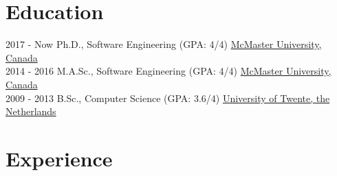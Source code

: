 \documentclass[letterpaper]{twentysecondcv} %
\begin{document}
\makeprofile %



\section{Education}

\begin{twenty} %
  \twentyitem
    {2017 - Now}
    {}
    {Ph.D., Software Engineering \textnormal{(GPA: 4/4)}}
    {\href{https://www.mcmaster.ca/}{McMaster University, Canada}}
    {}
    {}
    \\
  \twentyitem
    {2014 - 2016}
    {}
    {M.A.Sc., Software Engineering \textnormal{(GPA: 4/4)}}
    {\href{https://www.mcmaster.ca/}{McMaster University, Canada}}
    {}
    {}
    \\
  \twentyitem
    {2009 - 2013}
    {}
    {B.Sc., Computer Science \textnormal{(GPA: 3.6/4)}}
    {\href{https://www.utwente.nl/}{University of Twente, the Netherlands}}
    {}
    {}
\end{twenty}
\vspace{-.5em}


\section{Experience}
\end{document}
